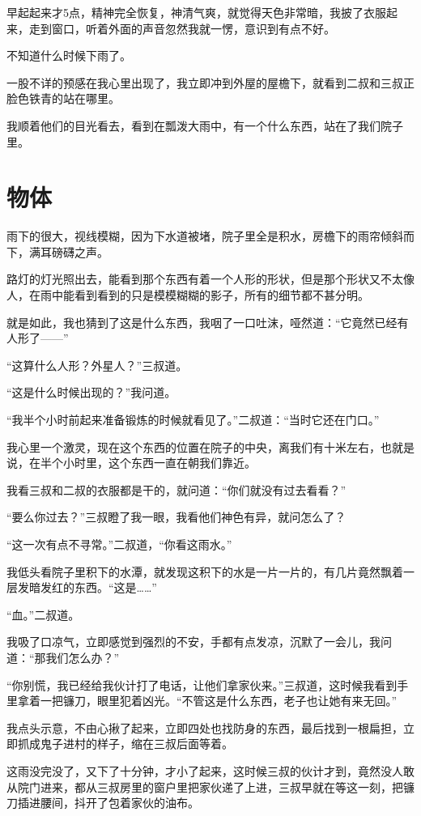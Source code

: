 早起起来才5点，精神完全恢复，神清气爽，就觉得天色非常暗，我披了衣服起来，走到窗口，听着外面的声音忽然我就一愣，意识到有点不好。

不知道什么时候下雨了。

一股不详的预感在我心里出现了，我立即冲到外屋的屋檐下，就看到二叔和三叔正脸色铁青的站在哪里。

我顺着他们的目光看去，看到在瓢泼大雨中，有一个什么东西，站在了我们院子里。

\chapter{物体}

雨下的很大，视线模糊，因为下水道被堵，院子里全是积水，房檐下的雨帘倾斜而下，满耳磅礴之声。

路灯的灯光照出去，能看到那个东西有着一个人形的形状，但是那个形状又不太像人，在雨中能看到看到的只是模模糊糊的影子，所有的细节都不甚分明。

就是如此，我也猜到了这是什么东西，我咽了一口吐沫，哑然道：“它竟然已经有人形了——”

“这算什么人形？外星人？”三叔道。

“这是什么时候出现的？”我问道。

“我半个小时前起来准备锻炼的时候就看见了。”二叔道：“当时它还在门口。”

我心里一个激灵，现在这个东西的位置在院子的中央，离我们有十米左右，也就是说，在半个小时里，这个东西一直在朝我们靠近。

我看三叔和二叔的衣服都是干的，就问道：“你们就没有过去看看？”

“要么你过去？”三叔瞪了我一眼，我看他们神色有异，就问怎么了？

“这一次有点不寻常。”二叔道，“你看这雨水。”

我低头看院子里积下的水潭，就发现这积下的水是一片一片的，有几片竟然飘着一层发暗发红的东西。“这是……”

“血。”二叔道。

我吸了口凉气，立即感觉到强烈的不安，手都有点发凉，沉默了一会儿，我问道：“那我们怎么办？”

“你别慌，我已经给我伙计打了电话，让他们拿家伙来。”三叔道，这时候我看到手里拿着一把镰刀，眼里犯着凶光。“不管这是什么东西，老子也让她有来无回。”

我点头示意，不由心揪了起来，立即四处也找防身的东西，最后找到一根扁担，立即抓成鬼子进村的样子，缩在三叔后面等着。

这雨没完没了，又下了十分钟，才小了起来，这时候三叔的伙计才到，竟然没人敢从院门进来，都从三叔房里的窗户里把家伙递了上进，三叔早就在等这一刻，把镰刀插进腰间，抖开了包着家伙的油布。

